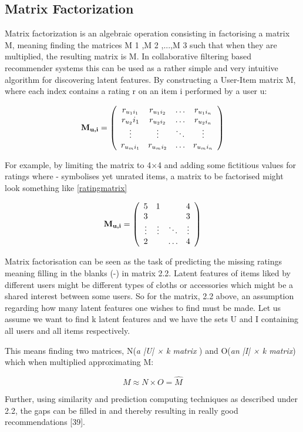 \subsection{Matrix Factorization}
Matrix factorization is an algebraic operation consisting in factorising a matrix M, meaning finding the matrices M 1 ,M 2 ,...,M 3 such that when they are multiplied, the resulting matrix is M. In collaborative filtering based recommender systems this can be used as a rather simple and very intuitive algorithm for discovering latent features. By constructing a User-Item matrix M, where each index contains a rating r on an item i performed by a user u:

\[  
\label{eq:ratingmatrix}
\textbf{M\textsubscript{u,i}} = \left(
\begin{array}{cccc}
r_{{u_1}{i_1}}&r_{{u_1}{i_2}}& \ldots&r_{{u_1}{i_n}} \\
r_{u_2}{i_1}&r_{{u_2}{i_2}}& \ldots&r_{{u_2}{i_n}} \\
\vdots & \vdots & \ddots & \vdots \\
r_{{u_m}{i_1}}&r_{{u_m}{i_2}}& \ldots&r_{{u_m}{i_n}}
\end{array}
\right)
\]

For example, by limiting the matrix to 4×4 and adding some fictitious values for ratings
where - symbolises yet unrated items, a matrix to be factorised might look something
like \eqref{ratingmatrix}


\[  
\label{eq:numbermatrix}
\textbf{M\textsubscript{u,i}} = \left(
\begin{array}{cccc}
5&1&\-&4 \\
3&\-&\-&3 \\
\vdots & \vdots & \ddots & \vdots \\
2&\-& \ldots&4
\end{array}
\right)
\]

Matrix factorisation can be seen as the task of predicting the missing ratings meaning filling in the blanks (-) in matrix 2.2. Latent features of items liked by different users might be different types of cloths or accessories which might be a shared interest between some users. So for the matrix, 2.2 above, an assumption regarding how many latent features one wishes to find must be made. Let us assume we want to find k latent features and we have the sets U and I containing all users and all items respectively.

This means finding two matrices, N(\textit{a  |U| × k matrix }) and O(\textit{an  |I| × k  matrix}) which when multiplied approximating M:

\[ M \approx N \times O = \hat{M} \]

Further, using similarity and prediction computing techniques as described under 2.2, the gaps can be filled in and thereby resulting in really good recommendations [39].

\section{}

